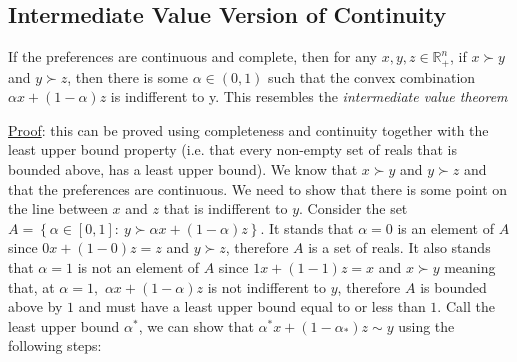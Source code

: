 \documentclass{article}
\begin{document}
\subsection{Intermediate Value Version of Continuity}
If the preferences are continuous and complete, then for any $x, y, z \in \mathbb{R}_{+}^{n}$, if $x \succ y$ and $y \succ z$, then there is some $\alpha \in (0,1)$ such that the convex combination $\alpha x + (1- \alpha)z$ is indifferent to y. This resembles the \textit{intermediate value theorem} \par \vspace{0.3em}
  \underline{Proof}: this can be proved using completeness and continuity together with the least upper bound property (i.e. that every non-empty set of reals that is bounded above, has a least upper bound). We know that $x \succ y$ and $y \succ z$ and that the preferences are continuous. We need to show that there is some point on the line between $x$ and $z$ that is indifferent to $y$. Consider the set $A = \left\{ \alpha \in [0,1]: \ y \succ \alpha x + (1- \alpha)z \right\}$. It stands that $\alpha = 0$ is an element of $A$ since $0x + (1 - 0)z = z$ and $y \succ z$, therefore $A$ is a set of reals. It also stands that $\alpha = 1$ is not an element of $A$ since $1x + (1-1)z = x$ and $x \succ y$ meaning that, at $\alpha = 1,$ $\alpha x + (1- \alpha)z$ is not indifferent to $y$, therefore $A$ is bounded above by $1$ and must have a least upper bound equal to or less than $1$. Call the least upper bound $\alpha^{*}$, we can show that $\alpha^{*}x + (1 - \alpha_{*})z \sim y$ using the following steps:
\end{document}
